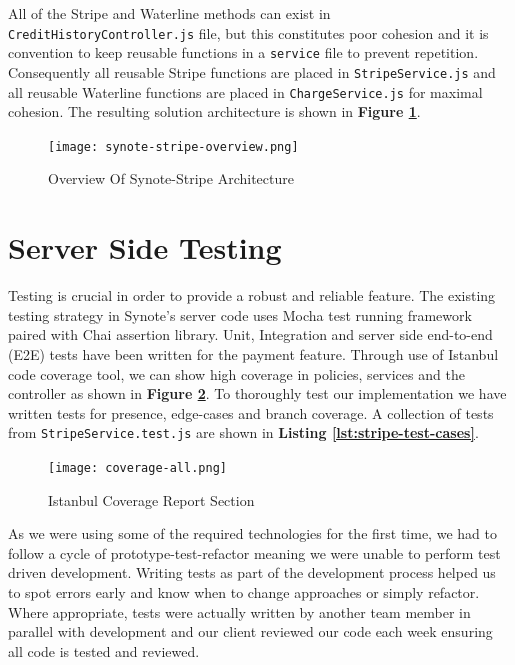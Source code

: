 All of the Stripe and Waterline methods can exist in \texttt{CreditHistoryController.js} file, but this constitutes poor cohesion and it is convention to keep reusable functions in a \texttt{service} file to prevent repetition. Consequently all reusable Stripe functions are placed in \texttt{StripeService.js} and all reusable Waterline functions are placed in \texttt{ChargeService.js} for maximal cohesion. The resulting solution architecture is shown in \textbf{Figure \ref{fig:synote-stripe}}.\\

\begin{figure}[!hbt]
  	\centering
 	\texttt{[image: synote-stripe-overview.png]}
  	\caption{Overview Of Synote-Stripe Architecture}
 	\label{fig:synote-stripe}
\end{figure}

\section{Server Side Testing}
\label{sec:server-side-testing}

Testing is crucial in order to provide a robust and reliable feature. The existing testing strategy in Synote's server code uses Mocha \cite{mocha} test running framework paired with Chai \cite{chai} assertion library. Unit, Integration and server side end-to-end (E2E) tests have been written for the payment feature. Through use of Istanbul \cite{istanbul} code coverage tool, we can show high coverage in policies, services and the controller as shown in \textbf{Figure \ref{fig:coverage}}. To thoroughly test our implementation we have written tests for presence, edge-cases and branch coverage. A collection of tests from \texttt{StripeService.test.js} are shown in \textbf{Listing \ref{lst:stripe-test-cases}}.\\

\begin{figure}[!hbt]
  	\centering
 	\texttt{[image: coverage-all.png]}
  	\caption{Istanbul Coverage Report Section}
 	\label{fig:coverage}
\end{figure}

As we were using some of the required technologies for the first time, we had to follow a cycle of prototype-test-refactor meaning we were unable to perform test driven development. Writing tests as part of the development process helped us to spot errors early and know when to change approaches or simply refactor. Where appropriate, tests were actually written by another team member in parallel with development and our client reviewed our code each week ensuring all code is tested and reviewed.\\

